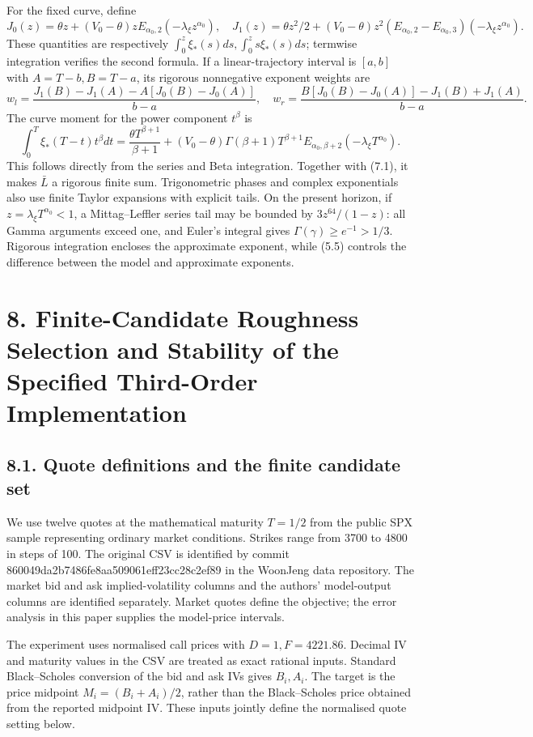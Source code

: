 \documentclass[a4paper,11pt]{article}
\begin{document}
For the fixed curve, define
\[
J_0(z)=\theta z+(V_0-\theta)zE_{\alpha_0,2}(-\lambda_\xi z^{\alpha_0}),\quad
J_1(z)=\theta z^2/2+
(V_0-\theta)z^2(E_{\alpha_0,2}-E_{\alpha_0,3})(-\lambda_\xi z^{\alpha_0}).
\tag{7.10}
\]
These quantities are respectively \(\int_0^z\xi_*(s)ds,\int_0^zs\xi_*(s)ds\); termwise integration verifies the second formula. If a linear-trajectory interval is \([a,b]\) with \(A=T-b,B=T-a\), its rigorous nonnegative exponent weights are
\[
w_l=\frac{J_1(B)-J_1(A)-A[J_0(B)-J_0(A)]}{b-a},\quad
w_r=\frac{B[J_0(B)-J_0(A)]-J_1(B)+J_1(A)}{b-a}.
\tag{7.11}
\]
The curve moment for the power component \(t^\beta\) is
\[
\int_0^T\xi_*(T-t)t^\beta dt
=\frac{\theta T^{\beta+1}}{\beta+1}
 +(V_0-\theta)\Gamma(\beta+1)T^{\beta+1}
 E_{\alpha_0,\beta+2}(-\lambda_\xi T^{\alpha_0}).
\tag{7.12}
\]
This follows directly from the series and Beta integration. Together with (7.1), it makes \(\bar L\) a rigorous finite sum. Trigonometric phases and complex exponentials also use finite Taylor expansions with explicit tails. On the present horizon, if \(z=\lambda_\xi T^{\alpha_0}<1\), a Mittag–Leffler series tail may be bounded by \(3z^{64}/(1-z)\): all Gamma arguments exceed one, and Euler's integral gives \(\Gamma(\gamma)\ge e^{-1}>1/3\). Rigorous integration encloses the approximate exponent, while (5.5) controls the difference between the model and approximate exponents.

\section*{8. Finite-Candidate Roughness Selection and Stability of the Specified Third-Order Implementation}

\subsection*{8.1. Quote definitions and the finite candidate set}

We use twelve quotes at the mathematical maturity \(T=1/2\) from the public SPX sample representing ordinary market conditions. Strikes range from 3700 to 4800 in steps of 100. The original CSV is identified by commit 860049da2b7486fe8aa509061eff23cc28c2ef89 in the WoonJeng data repository. The market bid and ask implied-volatility columns and the authors' model-output columns are identified separately. Market quotes define the objective; the error analysis in this paper supplies the model-price intervals.

The experiment uses normalised call prices with \(D=1,F=4221.86\). Decimal IV and maturity values in the CSV are treated as exact rational inputs. Standard Black–Scholes conversion of the bid and ask IVs gives \(B_i,A_i\). The target is the price midpoint \(M_i=(B_i+A_i)/2\), rather than the Black–Scholes price obtained from the reported midpoint IV. These inputs jointly define the normalised quote setting below.
\end{document}
